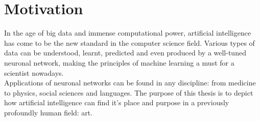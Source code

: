 \chapter*{Motivation}

In the age of big data and immense computational power, artificial intelligence has come to be the new standard in the computer science field. Various types of data can be understood, learnt, predicted and even produced by a well-tuned neuronal network, making the principles of machine learning a must for a scientist nowadays.\\


Applications of neuronal networks can be found in any discipline: from medicine to physics, social sciences and languages. The purpose of this thesis is to depict how artificial intelligence can find it's place and purpose in a previously profoundly human field: art.
